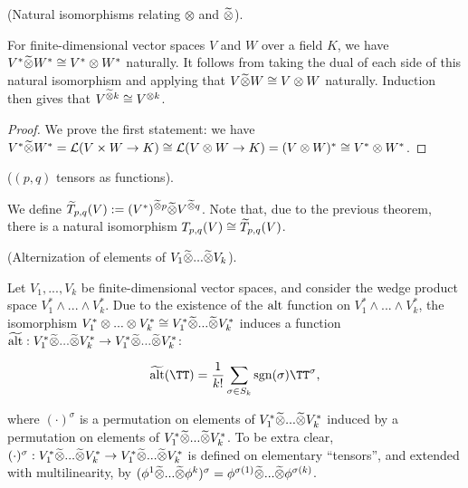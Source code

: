 \begin{theorem}
    (Natural isomorphisms relating $\otimes$ and $\widetilde{\otimes}$).
     
    For finite-dimensional vector spaces $V$ and $W$ over a field $K$, we have $V^* \widetilde{\otimes} W^* \cong V^* \otimes W^*$ naturally. It follows from taking the dual of each side of this natural isomorphism and applying that $V \widetilde{\otimes} W \cong V \otimes W$ naturally. Induction then gives that $V^{\widetilde{\otimes} k} \cong V^{\otimes k}$.
\end{theorem}

\begin{proof}
   We prove the first statement: we have $V^* \widetilde{\otimes} W^* = \mathcal{L}(V \times W \rightarrow K) \cong \mathcal{L}(V \otimes W \rightarrow K) = (V \otimes W)^* \cong V^* \otimes W^*$.
\end{proof}

\begin{defn}
    ($(p, q)$ tensors as functions).
    
    We define $\widetilde{T}_{p,q}(V) := (V^*)^{\widetilde{\otimes} p} \widetilde{\otimes} V^{\widetilde{\otimes} q}$. Note that, due to the previous theorem, there is a natural isomorphism $T_{p,q}(V) \cong \widetilde{T}_{p,q}(V)$.
\end{defn}

\begin{deriv}
    (Alternization of elements of $V_1 \widetilde{\otimes} ... \widetilde{\otimes} V_k$).
    
    Let $V_1, ..., V_k$ be finite-dimensional vector spaces, and consider the wedge product space $V_1^* \wedge ... \wedge V_k^*$. Due to the existence of the $\text{alt}$ function on $V_1^* \wedge ... \wedge V_k^*$, the isomorphism $V_1^* \otimes ... \otimes V_k^* \cong V_1^* \widetilde{\otimes} ... \widetilde{\otimes} V_k^*$ induces a function $\widetilde{\text{alt}}:V_1^* \widetilde{\otimes} ... \widetilde{\otimes} V_k^* \rightarrow V_1^* \widetilde{\otimes} ... \widetilde{\otimes} V_k^*$:
    
    \begin{align*}
        \talt(\TT) = \frac{1}{k!} \sum_{\sigma \in S_k} \sgn(\sigma) \TT^\sigma,
    \end{align*}
    
    where $(\cdot)^\sigma$ is a permutation on elements of $V_1^* \widetilde{\otimes} ... \widetilde{\otimes} V_k^*$ induced by a permutation on elements of $V_1^* \widetilde{\otimes} ... \widetilde{\otimes} V_k^*$. To be extra clear, $(\cdot)^\sigma:V_1^* \widetilde{\otimes} ... \widetilde{\otimes} V_k^* \rightarrow V_1^* \widetilde{\otimes} ... \widetilde{\otimes} V_k^*$ is defined on elementary ``tensors'', and extended with multilinearity, by $(\phi^1 \widetilde{\otimes} ... \widetilde{\otimes} \phi^k)^\sigma = \phi^{\sigma(1)} \widetilde{\otimes} ... \widetilde{\otimes} \phi^{\sigma(k)}$.
\end{deriv}

